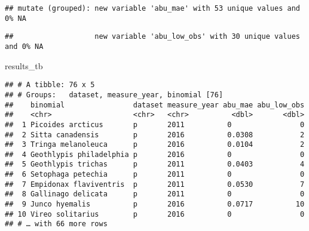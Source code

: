 \documentclass[
]{article}
\newenvironment{Shaded}{\begin{snugshade}}{\end{snugshade}}
\newcommand{\ControlFlowTok}[1]{\textcolor[rgb]{0.13,0.29,0.53}{\textbf{#1}}}
\newcommand{\DataTypeTok}[1]{\textcolor[rgb]{0.13,0.29,0.53}{#1}}
\newcommand{\KeywordTok}[1]{\textcolor[rgb]{0.13,0.29,0.53}{\textbf{#1}}}
\newcommand{\NormalTok}[1]{#1}
\newcommand{\OperatorTok}[1]{\textcolor[rgb]{0.81,0.36,0.00}{\textbf{#1}}}
\newcommand{\OtherTok}[1]{\textcolor[rgb]{0.56,0.35,0.01}{#1}}
\newcommand{\StringTok}[1]{\textcolor[rgb]{0.31,0.60,0.02}{#1}}
\begin{document}
\begin{Shaded}
\end{Shaded}

\begin{verbatim}
## mutate (grouped): new variable 'abu_mae' with 53 unique values and 0% NA
\end{verbatim}

\begin{verbatim}
##                   new variable 'abu_low_obs' with 30 unique values and 0% NA
\end{verbatim}

\begin{Shaded}
\begin{Highlighting}[]
\NormalTok{results_tb}
\end{Highlighting}
\end{Shaded}

\begin{verbatim}
## # A tibble: 76 x 5
## # Groups:   dataset, measure_year, binomial [76]
##    binomial                dataset measure_year abu_mae abu_low_obs
##    <chr>                   <chr>   <chr>          <dbl>       <dbl>
##  1 Picoides arcticus       p       2011          0                0
##  2 Sitta canadensis        p       2016          0.0308           2
##  3 Tringa melanoleuca      p       2016          0.0104           2
##  4 Geothlypis philadelphia p       2016          0                0
##  5 Geothlypis trichas      p       2011          0.0403           4
##  6 Setophaga petechia      p       2011          0                0
##  7 Empidonax flaviventris  p       2011          0.0530           7
##  8 Gallinago delicata      p       2011          0                0
##  9 Junco hyemalis          p       2016          0.0717          10
## 10 Vireo solitarius        p       2016          0                0
## # … with 66 more rows
\end{verbatim}
\end{document}
